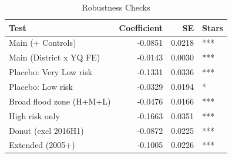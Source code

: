 \begin{table}[!h]
\centering
\caption{\label{tab:tab:robustness}Robustness Checks}
\centering
\begin{tabular}[t]{lrrl}
\toprule
Test & Coefficient & SE & Stars\\
\midrule
Main (+ Controls) & -0.0851 & 0.0218 & ***\\
Main (District x YQ FE) & -0.0143 & 0.0030 & ***\\
Placebo: Very Low risk & -0.1331 & 0.0336 & ***\\
Placebo: Low risk & -0.0329 & 0.0194 & *\\
Broad flood zone (H+M+L) & -0.0476 & 0.0166 & ***\\
\addlinespace
High risk only & -0.1663 & 0.0351 & ***\\
Donut (excl 2016H1) & -0.0872 & 0.0225 & ***\\
Extended (2005+) & -0.1005 & 0.0226 & ***\\
\bottomrule
\end{tabular}
\end{table}
